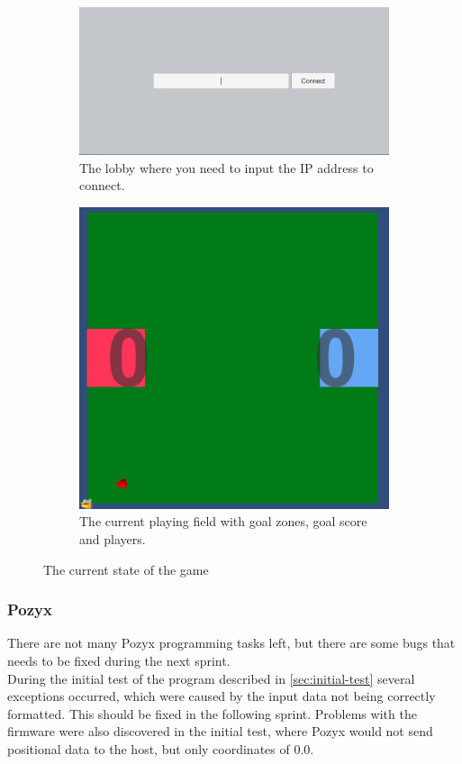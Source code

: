 \begin{figure}[H]
    \centering
    \begin{subfigure}{.5\textwidth}
        \centering
        \includegraphics[width=1\linewidth]{figures/sprint-4-lobby.PNG}
        \caption{The lobby where you need to input the IP address to connect.}
        \label{fig:sprint-4-lobby}
    \end{subfigure}
    \begin{subfigure}{.4\textwidth}
        \centering
        \includegraphics[width=.8\linewidth]{figures/sprint-4-game.PNG}
        \caption{The current playing field with goal zones, goal score and players.}
        \label{fig:sprint-4-game}
    \end{subfigure}
    \caption{The current state of the game}
    \label{fig:sprint-4-state-of-game}
\end{figure}

\subsubsection{Pozyx}
There are not many Pozyx programming tasks left, but there are some bugs that needs to be fixed during the next sprint.
\\
During the initial test of the program described in \autoref{sec:initial-test} several exceptions occurred, which were caused by the input data not being correctly formatted.
This should be fixed in the following sprint.
Problems with the firmware were also discovered in the initial test, where Pozyx would not send positional data to the host, but only coordinates of $0.0$.

